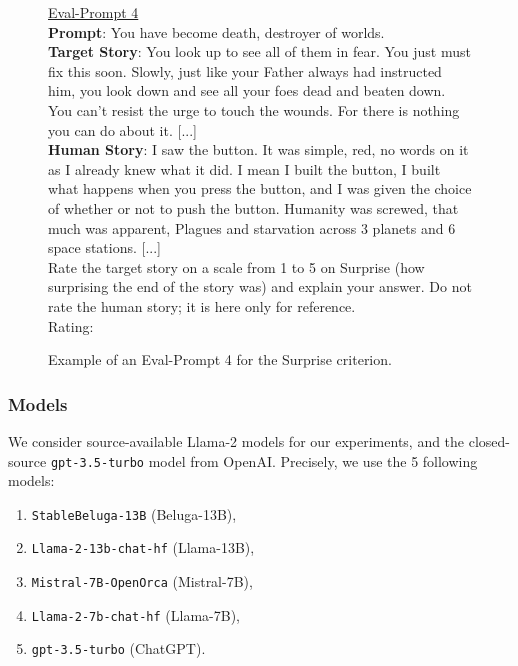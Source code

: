 \begin{figure}[h!]
    \begin{framed}
    \underline{Eval-Prompt 4}\\
    
    \noindent \textbf{Prompt}: You have become death, destroyer of worlds.\\
    
    \noindent \textbf{Target Story}: You look up to see all of them in fear. You just must fix this soon. Slowly, just like your Father always had instructed him, you look down and see all your foes dead and beaten down. You can't resist the urge to touch the wounds. For there is nothing you can do about it. [...]\\
    
    \noindent \textbf{Human Story}: I saw the button. It was simple, red, no words on it as I already knew what it did. I mean I built the button, I built what happens when you press the button, and I was given the choice of whether or not to push the button. Humanity was screwed, that much was apparent, Plagues and starvation across 3 planets and 6 space stations. [...]\\
    
    Rate the target story on a scale from 1 to 5 on Surprise (how surprising the end of the story was) and explain your answer. Do not rate the human story; it is here only for reference.\\
    
    Rating:
    \end{framed}
    \caption{Example of an Eval-Prompt 4 for the Surprise criterion.}
    \label{fig:eval_prompt_4}
\end{figure}

\clearpage

\subsubsection{{\asefull} Models}

We consider source-available Llama-2 \citep{touvron2023llama2} models for our experiments, and the closed-source \texttt{gpt-3.5-turbo} model from OpenAI. Precisely, we use the 5 following models: 

\begin{enumerate}[noitemsep]
    \item \texttt{StableBeluga-13B} (Beluga-13B),
    \item \texttt{Llama-2-13b-chat-hf} (Llama-13B),
    \item \texttt{Mistral-7B-OpenOrca} (Mistral-7B),
    \item \texttt{Llama-2-7b-chat-hf} (Llama-7B),
    \item \texttt{gpt-3.5-turbo} (ChatGPT).
\end{enumerate}

